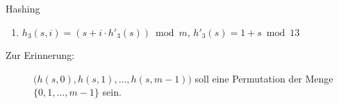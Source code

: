 \documentclass[11pt,a4paper]{article}
\begin{document}
\begin{aufgabe}{1}{Hashing}
\begin{enumerate}
\begin{enumerate}[label=\roman*)]
            \item $h_3(s, i) = (s + i \cdot h'_3(s)) \bmod{m}$, $h'_3(s) = 1 + s \bmod{13}$
        \end{enumerate}
        \begin{description}
            \item[Zur Erinnerung:] $\big(h(s, 0), h(s, 1), \ldots, h(s, m - 1)\big)$ soll eine Permutation der Menge $\{0, 1, \ldots, m - 1\}$ sein.
        \end{description}
    \end{enumerate}
\end{aufgabe}
\end{document}
